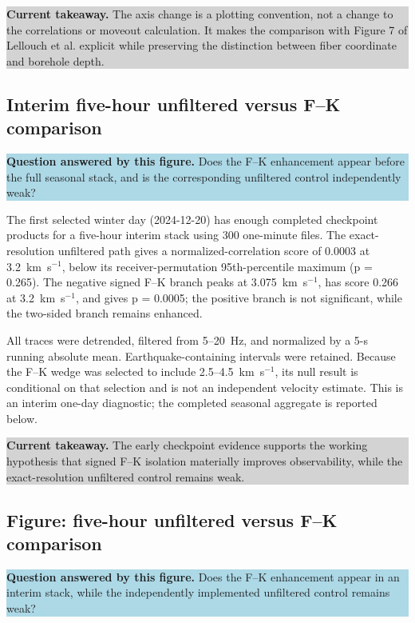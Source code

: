 \documentclass[11pt]{article}
\newcommand{\figquestion}[1]{\par\medskip\noindent\colorbox{lightblue}{\parbox{0.95\linewidth}{\textcolor{questionblue}{\textbf{Question answered by this figure.}} #1}}\par\medskip}
\newcommand{\takeaway}[1]{\par\smallskip\noindent\colorbox{lightgray}{\parbox{0.95\linewidth}{\textbf{Current takeaway.} #1}}\par\medskip}
\begin{document}
\takeaway{The axis change is a plotting convention, not a change to the correlations or moveout calculation. It makes the comparison with Figure 7 of Lellouch et al. explicit while preserving the distinction between fiber coordinate and borehole depth.}


\subsection{Interim five-hour unfiltered versus F--K comparison}
\figquestion{Does the F--K enhancement appear before the full seasonal stack, and is the corresponding unfiltered control independently weak?}

The first selected winter day (2024-12-20) has enough completed checkpoint products for a five-hour interim stack using 300 one-minute files. The exact-resolution unfiltered path gives a normalized-correlation score of 0.0003 at 3.2~km~s$^{-1}$, below its receiver-permutation 95th-percentile maximum (p = 0.265). The negative signed F--K branch peaks at 3.075~km~s$^{-1}$, has score 0.266 at 3.2~km~s$^{-1}$, and gives p = 0.0005; the positive branch is not significant, while the two-sided branch remains enhanced.

All traces were detrended, filtered from 5--20~Hz, and normalized by a 5-s running absolute mean. Earthquake-containing intervals were retained. Because the F--K wedge was selected to include 2.5--4.5~km~s$^{-1}$, its null result is conditional on that selection and is not an independent velocity estimate. This is an interim one-day diagnostic; the completed seasonal aggregate is reported below.

\takeaway{The early checkpoint evidence supports the working hypothesis that signed F--K isolation materially improves observability, while the exact-resolution unfiltered control remains weak.}


\subsection{Figure: five-hour unfiltered versus F--K comparison}
\figquestion{Does the F--K enhancement appear in an interim stack, while the independently implemented unfiltered control remains weak?}
\end{document}
